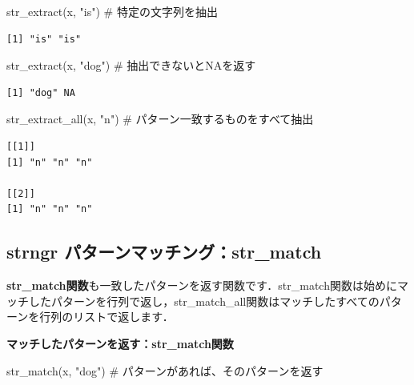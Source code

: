 \documentclass[
  letterpaper,
  DIV=11,
  numbers=noendperiod]{scrreprt}
\newenvironment{Shaded}{\begin{snugshade}}{\end{snugshade}}
\newcommand{\CommentTok}[1]{\textcolor[rgb]{0.37,0.37,0.37}{#1}}
\newcommand{\FunctionTok}[1]{\textcolor[rgb]{0.28,0.35,0.67}{#1}}
\newcommand{\NormalTok}[1]{\textcolor[rgb]{0.00,0.23,0.31}{#1}}
\newcommand{\StringTok}[1]{\textcolor[rgb]{0.13,0.47,0.30}{#1}}
\begin{document}
\begin{Shaded}
\begin{Highlighting}[]
\FunctionTok{str\_extract}\NormalTok{(x, }\StringTok{"is"}\NormalTok{) }\CommentTok{\# 特定の文字列を抽出}
\end{Highlighting}
\end{Shaded}

\begin{verbatim}
[1] "is" "is"
\end{verbatim}

\begin{Shaded}
\begin{Highlighting}[]
\FunctionTok{str\_extract}\NormalTok{(x, }\StringTok{"dog"}\NormalTok{) }\CommentTok{\# 抽出できないとNAを返す}
\end{Highlighting}
\end{Shaded}

\begin{verbatim}
[1] "dog" NA   
\end{verbatim}

\begin{Shaded}
\begin{Highlighting}[]
\FunctionTok{str\_extract\_all}\NormalTok{(x, }\StringTok{"n"}\NormalTok{) }\CommentTok{\# パターン一致するものをすべて抽出}
\end{Highlighting}
\end{Shaded}

\begin{verbatim}
[[1]]
[1] "n" "n" "n"

[[2]]
[1] "n" "n" "n"
\end{verbatim}

\hypertarget{strngr-ux30d1ux30bfux30fcux30f3ux30deux30c3ux30c1ux30f3ux30b0str_match}{%
\subsection{strngr
パターンマッチング：str\_match}\label{strngr-ux30d1ux30bfux30fcux30f3ux30deux30c3ux30c1ux30f3ux30b0str_match}}

\textbf{str\_match関数}も一致したパターンを返す関数です．str\_match関数は始めにマッチしたパターンを行列で返し，str\_match\_all関数はマッチしたすべてのパターンを行列のリストで返します．

\textbf{マッチしたパターンを返す：str\_match関数}

\begin{Shaded}
\begin{Highlighting}[]
\FunctionTok{str\_match}\NormalTok{(x, }\StringTok{"dog"}\NormalTok{) }\CommentTok{\# パターンがあれば、そのパターンを返す}
\end{Highlighting}
\end{Shaded}
\end{document}

